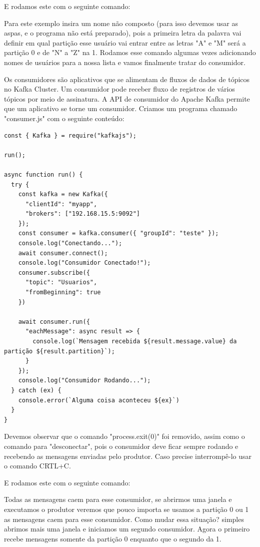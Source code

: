 \documentclass[a4paper,11pt]{article}
\begin{document}
E rodamos este com o seguinte comando: \\

Para este exemplo insira um nome não composto (para isso devemos usar as aspas, e o programa não está preparado), pois a primeira letra da palavra vai definir em qual partição esse usuário vai entrar entre as letras "A" e "M" será a partição 0 e de "N" a "Z" na 1. Rodamos esse comando algumas vezes adicionando nomes de usuários para a nossa lista e vamos finalmente tratar do consumidor. 

Os consumidores são aplicativos que se alimentam de fluxos de dados de tópicos no Kafka Cluster. Um consumidor pode receber fluxo de registros de vários tópicos por meio de assinatura. A API de consumidor do Apache Kafka permite que um aplicativo se torne um consumidor. Criamos um programa chamado "consumer.js" com o seguinte conteúdo:
\begin{lstlisting}[]
const { Kafka } = require("kafkajs");

run();

async function run() {
  try {
    const kafka = new Kafka({
      "clientId": "myapp",
      "brokers": ["192.168.15.5:9092"]
    });
    const consumer = kafka.consumer({ "groupId": "teste" });
    console.log("Conectando...");
    await consumer.connect();
    console.log("Consumidor Conectado!");
    consumer.subscribe({
      "topic": "Usuarios",
      "fromBeginning": true
    })

    await consumer.run({
      "eachMessage": async result => {
        console.log(`Mensagem recebida ${result.message.value} da partição ${result.partition}`);
      }
    });
    console.log("Consumidor Rodando...");
  } catch (ex) {
    console.error(`Alguma coisa aconteceu ${ex}`)
  }
}
\end{lstlisting}

Devemos observar que o comando "process.exit(0)" foi removido, assim como o comando para "desconectar", pois o consumidor deve ficar sempre rodando e recebendo as mensagens enviadas pelo produtor. Caso precise interrompê-lo usar o comando CRTL+C.

E rodamos este com o seguinte comando: \\

Todas as mensagens caem para esse consumidor, se abrirmos uma janela e executamos o produtor veremos que pouco importa se usamos a partição 0 ou 1 as mensagens caem para esse consumidor. Como mudar essa situação? simples abrimos mais uma janela e iniciamos um segundo consumidor. Agora o primeiro recebe mensagens somente da partição 0 enquanto que o segundo da 1.
\end{document}
